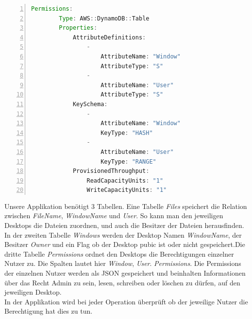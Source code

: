 \documentclass[a4paper, 12pt]{scrreprt}
\renewcommand\_{\textunderscore\allowbreak}
\begin{document}





\begin{lstlisting}[xleftmargin=\parindent,numbers=left,numberstyle=\small,numbersep=8pt,frame=L,mathescape=true, basicstyle=\small, language=Java, lineskip={1.0pt}]
Permissions:
        Type: AWS::DynamoDB::Table
        Properties:
            AttributeDefinitions:
                -
                    AttributeName: "Window"
                    AttributeType: "S"
                -
                    AttributeName: "User"
                    AttributeType: "S"
            KeySchema:
                -
                    AttributeName: "Window"
                    KeyType: "HASH"
                -
                    AttributeName: "User"
                    KeyType: "RANGE"
            ProvisionedThroughput:
                ReadCapacityUnits: "1"
                WriteCapacityUnits: "1"
\end{lstlisting}

Unsere Applikation benötigt 3 Tabellen. Eine Tabelle \textit{Files} speichert die Relation zwischen \textit{FileName}, \textit{WindowName} und \textit{User}. So kann man den jeweiligen Desktops die Dateien zuordnen, und auch die Besitzer der Dateien herausfinden. In der zweiten Tabelle \textit{Windows} werden der Desktop Namen \textit{WindowName}, der Besitzer \textit{Owner} und ein Flag ob der Desktop pubic ist oder nicht gespeichert.Die dritte Tabelle \textit{Permissions} ordnet den Desktops die Berechtigungen einzelner Nutzer zu. Die Spalten lautet hier \textit{Window}, \textit{User}. \textit{Permissions}. Die Permissions der einzelnen Nutzer werden als JSON gespeichert und beinhalten Informationen über das Recht Admin zu sein, lesen, schreiben oder löschen zu dürfen, auf den jeweiligen Desktop. \\
In der Applikation wird bei jeder Operation überprüft ob der jeweilige Nutzer die Berechtigung hat dies zu tun.
\end{document}
